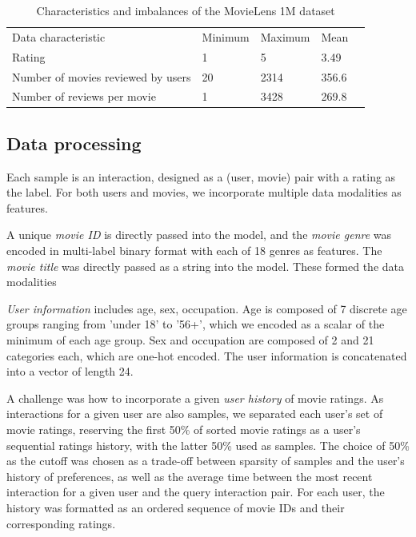 \documentclass{bioinfo}
\begin{document}
\begin{methods}
\begin{table}[h]
\begin{tabular}{|l|l|l|l|l}
\cline{1-4}
Data characteristic &  Minimum & Maximum & Mean &  \\ \cline{1-4}
Rating & 1 & 5 & 3.49 &  \\ \cline{1-4}
Number of movies reviewed by users & 20 & 2314 & 356.6 &  \\ \cline{1-4}
Number of reviews per movie & 1 & 3428 & 269.8 &  \\ \cline{1-4}
\end{tabular}
\caption{Characteristics and imbalances of the MovieLens 1M dataset }
\label{tab:dataset}
\end{table}

\subsection{Data processing}

Each sample is an interaction, designed as a (user, movie) pair with a rating as the label. For both users and movies, we incorporate multiple data modalities as features.

A unique \textit{movie ID} is directly passed into the model, and the \textit{movie genre} was encoded in multi-label binary format with each of 18 genres as features. The \textit{movie title} was directly passed as a string into the model. These formed the data modalities

\textit{User information} includes age, sex, occupation. Age is composed of 7 discrete age groups ranging from 'under 18' to '56+', which we encoded as a scalar of the minimum of each age group. Sex and occupation are composed of 2 and 21 categories each, which are one-hot encoded. The user information is concatenated into a vector of length 24.

A challenge was how to incorporate a given \textit{user history} of movie ratings. As interactions for a given user are also samples, we separated each user's set of movie ratings, reserving the first 50\% of sorted movie ratings as a user's sequential ratings history, with the latter 50\% used as samples. The choice of 50\% as the cutoff was chosen as a trade-off between sparsity of samples and the user's history of preferences, as well as the average time between the most recent interaction for a given user and the query interaction pair. For each user, the history was formatted as an ordered sequence of movie IDs and their corresponding ratings.


\end{methods}
\end{document}
